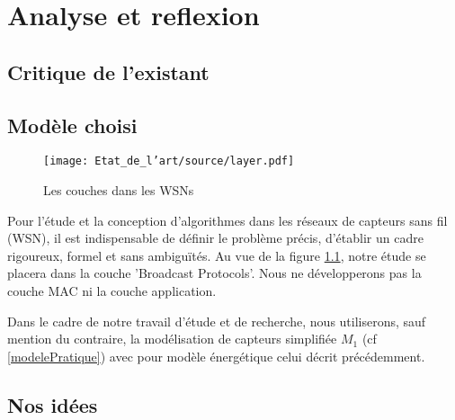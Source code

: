 
\chapter{Analyse et reflexion}\label{Analyse_et_reflexion}


\section{Critique de l'existant}


\section{Modèle choisi}

\begin{figure}[h]
\centering
\texttt{[image: Etat\_de\_l'art/source/layer.pdf]}
\caption{\label{Layer} Les couches dans les WSNs}
\end{figure}

Pour l'étude et la conception d'algorithmes dans les réseaux de capteurs sans fil (WSN), il est indispensable de définir le problème précis, d'établir un cadre rigoureux, formel et sans ambiguïtés. Au vue de la figure \ref{Layer}, notre étude se placera dans la couche 'Broadcast Protocols'. Nous ne développerons pas la couche MAC ni la couche application.

Dans le cadre de notre travail d'étude et de recherche, nous utiliserons, sauf mention du contraire, la modélisation de capteurs simplifiée $M_1$ (cf \ref{modelePratique}) avec pour modèle énergétique celui décrit précédemment.
 


\section{Nos idées}

